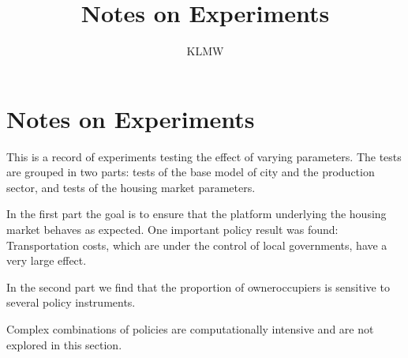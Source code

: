 \documentclass{article}
\title{Notes on Experiments}
\author{KLMW}
\begin{document}
\maketitle
\tableofcontents \newpage
\section{Notes on Experiments}
This is a record of experiments testing the effect of varying parameters. The tests are grouped in two parts: tests of the base model of city and the production sector, and tests of the housing market parameters. 

In the first part the goal is to ensure that the platform underlying the housing market behaves as expected. One important policy result was found: Transportation costs, which are under the control of local governments, have a very large effect.

In the second part we find that the proportion of owneroccupiers is sensitive to  several policy instruments. 

Complex combinations of policies are computationally intensive and are not explored in this section.

\vspace{.5cm}
\end{document}
